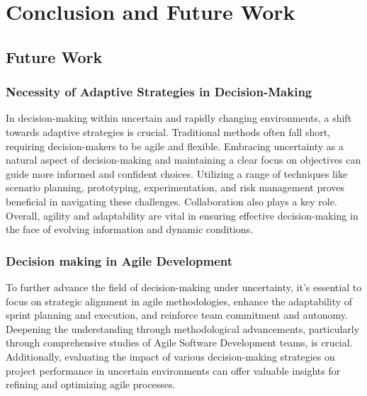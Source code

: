 \documentclass{article}
\begin{document}
\section{Conclusion and Future Work}
\subsection{Future Work}
\subsubsection{Necessity of Adaptive Strategies in Decision-Making}
In decision-making within uncertain and rapidly changing environments, a shift towards adaptive strategies is crucial. Traditional methods often fall short, requiring decision-makers to be agile and flexible. Embracing uncertainty as a natural aspect of decision-making and maintaining a clear focus on objectives can guide more informed and confident choices. Utilizing a range of techniques like scenario planning, prototyping, experimentation, and risk management proves beneficial in navigating these challenges. Collaboration also plays a key role. Overall, agility and adaptability are vital in ensuring effective decision-making in the face of evolving information and dynamic conditions.
\subsubsection{Decision making in Agile Development}
To further advance the field of decision-making under uncertainty, it's essential to focus on strategic alignment in agile methodologies, enhance the adaptability of sprint planning and execution, and reinforce team commitment and autonomy.\cite{drury2011decision} Deepening the understanding through methodological advancements, particularly through comprehensive studies of Agile Software Development teams, is crucial. Additionally, evaluating the impact of various decision-making strategies on project performance in uncertain environments can offer valuable insights for refining and optimizing agile processes.
\end{document}
